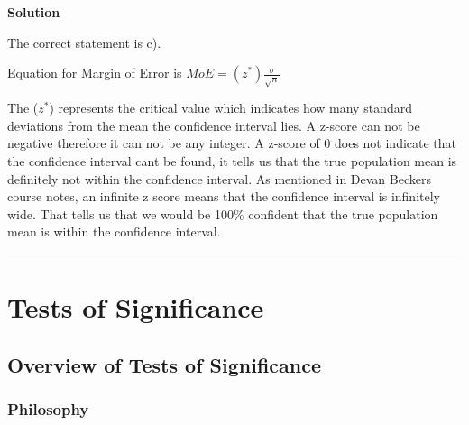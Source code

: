 \documentclass[
  letterpaper,
  DIV=11,
  numbers=noendperiod,
  oneside]{scrreprt}
\begin{document}
\textbf{Solution}

The correct statement is c).

Equation for Margin of Error is \(MoE = (z^*) \frac{\sigma}{\sqrt{n}}\)

The (\(z^*\)) represents the critical value which indicates how many
standard deviations from the mean the confidence interval lies. A
z-score can not be negative therefore it can not be any integer. A
z-score of 0 does not indicate that the confidence interval cant be
found, it tells us that the true population mean is definitely not
within the confidence interval. As mentioned in Devan Beckers course
notes, an infinite z score means that the confidence interval is
infinitely wide. That tells us that we would be 100\% confident that the
true population mean is within the confidence interval.

\begin{center}\rule{0.5\linewidth}{0.5pt}\end{center}

\hypertarget{tests-of-significance}{%
\chapter{Tests of Significance}\label{tests-of-significance}}

\hypertarget{overview-of-tests-of-significance}{%
\section{Overview of Tests of
Significance}\label{overview-of-tests-of-significance}}

\hypertarget{philosophy}{%
\subsection{Philosophy}\label{philosophy}}
\end{document}
